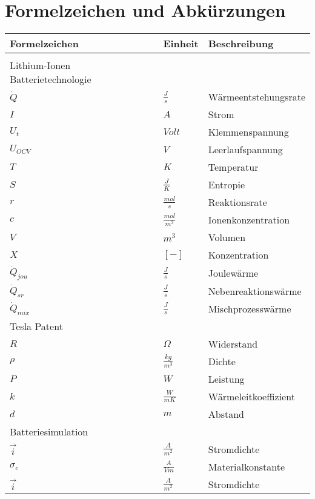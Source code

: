 \section{Formelzeichen und Abkürzungen}
\hspace{0.7cm}
\begin{tabularx}{15.1cm}{llX}
	\textbf{Formelzeichen} & \textbf{Einheit} & \textbf{Beschreibung} \\
	\hline \\ [-0.2cm]
	Lithium-Ionen Batterietechnologie&&\\ [0.1cm] 
	\hline
	$\dot{Q}$ & $\frac{J}{s}$ & Wärmeentstehungsrate\\ [0.1cm]
	$I$ & $A$ & Strom\\ [0.1cm]
	$U_{t}$ & $Volt$ & Klemmenspannung\\ [0.1cm]
	$U_{OCV}$ & $V$ & Leerlaufspannung\\ [0.1cm]
	$T$ & $K$ & Temperatur\\ [0.1cm]
	$S$ & $\frac{J}{K}$ & Entropie\\ [0.1cm]
	$r$ & $\frac{mol}{s}$ & Reaktionsrate\\ [0.1cm]
	$c$ & $\frac{mol}{m^{3}}$ & Ionenkonzentration\\ [0.1cm]
	$V$ & $m^{3}$ & Volumen\\ [0.1cm]
	$X$ & $[-]$ & Konzentration\\ [0.1cm]
	$\dot{Q}_{jou}$ & $\frac{J}{s}$ & Joulewärme\\ [0.1cm]
	$\dot{Q}_{sr}$ & $\frac{J}{s}$ & Nebenreaktionswärme\\ [0.1cm]
	$\dot{Q}_{mix}$ & $\frac{J}{s}$ & Mischprozesswärme\\ [0.1cm]
	\hline
	Tesla Patent && \\ [0.1cm]
	\hline
	$R$ & $\Omega$ & Widerstand\\ [0.1cm]
	$\rho$ & $\frac{kg}{m^{3}}$ & Dichte\\ [0.1cm]
	$P$ & $W$ & Leistung\\ [0.1cm]
	$k$ & $\frac{W}{mK}$ & Wärmeleitkoeffizient\\ [0.1cm]
	$d$ & $m$ & Abstand\\ [0.1cm]
	\hline
	Batteriesimulation & & \\ [0.1cm]
	\hline
	$\vec{i}$ & $\frac{A}{m^{2}}$ & Stromdichte\\ [0.1cm]
	$\sigma_{c}$ & $\frac{A}{Vm}$ & Materialkonstante\\ [0.1cm]
	$\vec{i}$ & $\frac{A}{m^{2}}$ & Stromdichte\\ [0.1cm]

\end{tabularx}
